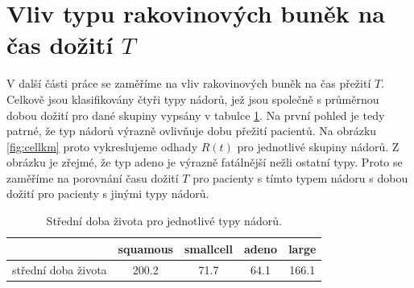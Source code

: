 \documentclass[10pt]{article}
\begin{document}
\section{Vliv typu rakovinových buněk na čas dožití $T$}
V další části práce se zaměříme na vliv rakovinových buněk na čas přežití $T$. Celkově jsou klasifikovány čtyři typy nádorů, jež jsou společně s průměrnou dobou dožití pro dané skupiny vypsány v tabulce \ref{tab:nadory}. Na první pohled je tedy patrné, že typ nádorů výrazně ovlivňuje dobu přežití pacientů. Na obrázku \ref{fig:cellkm} proto vykreslujeme odhady $R(t)$ pro jednotlivé skupiny nádorů. Z obrázku je zřejmé, že typ adeno je výrazně fatálnější nežli ostatní typy. Proto se zaměříme na porovnání času dožití $T$ pro pacienty s tímto typem nádoru s dobou dožití pro pacienty s jinými typy nádorů.
\begin{table}[htb!]
\centering
\begin{tabular}{lcccc}
    & squamous & smallcell & adeno &  large \\
    \toprule
střední doba života & 200.2 & 71.7 & 64.1 & 166.1
\end{tabular}\caption{Střední doba života pro jednotlivé typy nádorů.}\label{tab:nadory}
\end{table}  
\end{document}
